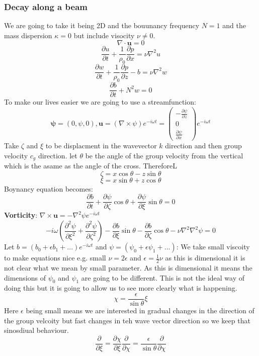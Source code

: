 \documentclass{article}
\begin{document}
\subsubsection{Decay along a beam}
We are going to take it being 2D and the bouunancy frequency $N= 1$ and the mass dispersion $\kappa = 0$ but include visocity $\nu \neq 0$.
$$
\nabla \cdot \bm u = 0
$$
$$
\frac{\partial u}{\partial t} + \frac{1}{\rho_0} \frac{\partial p}{\partial x} = \nu \nabla^2 u
$$
$$
\frac{\partial w}{\partial t} + \frac{1}{\rho_0} \frac{\partial p}{\partial z} -b = \nu \nabla^2 w
$$
$$
\frac{\partial b}{\partial t} + N^2 w = 0
$$
To make our lives easier we are going to use a streamfunction:
$$
\bm \psi = (0, \psi, 0), \bm u = (\nabla \times \psi) e^{- i \omega t} = \begin{pmatrix}-\frac{\partial \psi}{\partial z}\\0 \\ \frac{\partial \psi}{\partial x} \end{pmatrix}e^{-i \omega t}
$$
Take $\zeta$ and $\xi$ to be displacment in the wavevector $k$ direction and then group velocity $c_g$ direction. let $\theta$ be the angle of the group velocity from the vertical which is the asame as the angle of the cross. ThereforeL
$$
\zeta = x \cos \theta - z \sin \theta
$$
$$
\xi = x \sin \theta + z \cos \theta
$$
Boynancy equation becomes:
$$
\frac{\partial b}{\partial t} + \frac{\partial \psi}{\partial \zeta}\cos \theta + \frac{\partial \psi}{\partial \xi} \sin \theta = 0
$$
\textbf{Vorticity}: $\nabla \times \bm u = - \nabla^2 \psi e^{-i \omega t}$
$$
-i \omega ( \frac{\partial ^2 \psi}{\partial \xi^2} + \frac{\partial ^2 \psi}{\partial \zeta^2}) - \frac{\partial b}{\partial \xi} \sin \theta - \frac{\partial b}{\partial \zeta} \cos \theta - \nu \nabla^2 \nabla^2 \psi = 0
$$
Let $b =  (b_0 + \epsilon b_1 +...) e^{-i\omega t}$ and $\psi = (\psi_0 + \epsilon \psi_1 + ...)$:
We take small viscoity to make equations nice e.g. small $\nu = 2 \epsilon$ and $\epsilon = \frac{1}{2} \nu$ as this is dimensional it is not clear what we mean by small parameter. As this is dimensional it means the dimensions of $\psi_0$ and $\psi_1$ are going to be different. This is not the ideal way of doing this but it is going to allow us to see more clearly what is happening.
$$
\chi = \frac{\epsilon}{\sin \theta} \xi
$$
Here $\epsilon$ being small means we are interested in gradual changes in the direction of the group velcoity but fast changes in teh wave vector direction so we keep that sinosdiual behaviour. 
$$
\frac{\partial}{\partial \xi} = \frac{\partial \chi}{\partial \xi} \frac{\partial}{\partial \chi} = \frac{\epsilon}{\sin \theta} \frac{\partial }{\partial \chi}
$$
\end{document}
